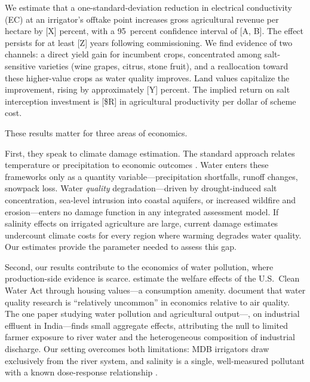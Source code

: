 \documentclass[12pt]{article}
\begin{document}
We estimate that a one-standard-deviation reduction in electrical conductivity (EC) at an irrigator's offtake point increases gross agricultural revenue per hectare by [X] percent, with a 95~percent confidence interval of [A, B]. The effect persists for at least [Z] years following commissioning. We find evidence of two channels: a direct yield gain for incumbent crops, concentrated among salt-sensitive varieties (wine grapes, citrus, stone fruit), and a reallocation toward these higher-value crops as water quality improves. Land values capitalize the improvement, rising by approximately [Y] percent. The implied return on salt interception investment is [\$R] in agricultural productivity per dollar of scheme cost.

These results matter for three areas of economics.

First, they speak to climate damage estimation. The standard approach relates temperature or precipitation to economic outcomes \citep{schlenker2009nonlinear, dell2012temperature, burke2015global, hsiang2017estimating}. Water enters these frameworks only as a quantity variable---precipitation shortfalls, runoff changes, snowpack loss. Water \emph{quality} degradation---driven by drought-induced salt concentration, sea-level intrusion into coastal aquifers, or increased wildfire and erosion---enters no damage function in any integrated assessment model. If salinity effects on irrigated agriculture are large, current damage estimates undercount climate costs for every region where warming degrades water quality. Our estimates provide the parameter needed to assess this gap.

Second, our results contribute to the economics of water pollution, where production-side evidence is scarce. \citet{keiser2019consequences} estimate the welfare effects of the U.S.\ Clean Water Act through housing values---a consumption amenity. \citet{keiser2019burning} document that water quality research is ``relatively uncommon'' in economics relative to air quality. The one paper studying water pollution and agricultural output---\citet{hagerty2025industrial}, on industrial effluent in India---finds small aggregate effects, attributing the null to limited farmer exposure to river water and the heterogeneous composition of industrial discharge. Our setting overcomes both limitations: MDB irrigators draw exclusively from the river system, and salinity is a single, well-measured pollutant with a known dose-response relationship \citep{maas1977salt, munns2008mechanisms}.
\end{document}
